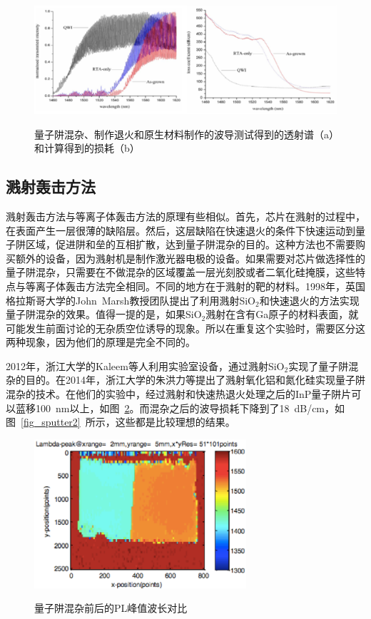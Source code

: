 \documentclass{ZJUthesis}
\begin{document}
\begin{figure}[htbp]
  \centering
  \includegraphics[width=1.0\textwidth]{./Pictures/icp3.eps}\\
  \caption{量子阱混杂、制作退火和原生材料制作的波导测试得到的透射谱（a）和计算得到的损耗（b）}
  \label{fig_icp3}
\end{figure}

\subsection{溅射轰击方法}

溅射轰击方法与等离子体轰击方法的原理有些相似。首先，芯片在溅射的过程中，在表面产生一层很薄的缺陷层。然后，这层缺陷在快速退火的条件下快速运动到量子阱区域，促进阱和垒的互相扩散，达到量子阱混杂的目的。这种方法也不需要购买额外的设备，因为溅射机是制作激光器电极的设备。如果需要对芯片做选择性的量子阱混杂，只需要在不做混杂的区域覆盖一层光刻胶或者二氧化硅掩膜，这些特点与等离子体轰击方法完全相同。不同的地方在于溅射的靶的材料。1998年，英国格拉斯哥大学的John~Marsh教授团队提出了利用溅射SiO$_2$和快速退火的方法实现量子阱混杂的效果\cite{Mcdougall1998Monolithic}。值得一提的是，如果SiO$_2$溅射在含有Ga原子的材料表面，就可能发生前面讨论的无杂质空位诱导的现象。所以在重复这个实验时，需要区分这两种现象，因为他们的原理是完全不同的。

2012年，浙江大学的Kaleem等人利用实验室设备，通过溅射SiO$_2$实现了量子阱混杂的目的。在2014年，浙江大学的朱洪力等提出了溅射氧化铝和氮化硅\cite{Zhu2014Bandgap}实现量子阱混杂的技术。在他们的实验中，经过溅射和快速热退火处理之后的InP量子阱片可以蓝移100~nm以上，如图~\ref{fig_sputter}。而混杂之后的波导损耗下降到了18~dB/cm，如图~\ref{fig_sputter2}~所示，这些都是比较理想的结果。

\begin{figure}[htbp]
  \centering
  \includegraphics[width=0.7\textwidth]{./Pictures/sputter.eps}\\
  \caption{量子阱混杂前后的PL峰值波长对比}
  \label{fig_sputter}
\end{figure}
\end{document}
